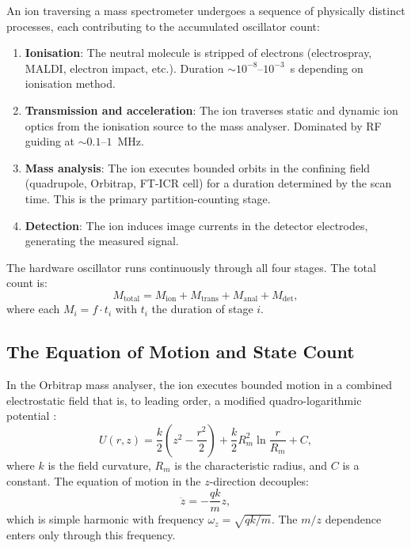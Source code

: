 \documentclass[twocolumn,10pt]{article}
\begin{document}
An ion traversing a mass spectrometer undergoes a sequence of physically distinct processes, each contributing to the accumulated oscillator count:

\begin{enumerate}
    \item \textbf{Ionisation}: The neutral molecule is stripped of electrons (electrospray, MALDI, electron impact, etc.). Duration $\sim 10^{-8}$--$10^{-3}$~s depending on ionisation method.

    \item \textbf{Transmission and acceleration}: The ion traverses static and dynamic ion optics from the ionisation source to the mass analyser. Dominated by RF guiding at $\sim 0.1$--$1$~MHz.

    \item \textbf{Mass analysis}: The ion executes bounded orbits in the confining field (quadrupole, Orbitrap, FT-ICR cell) for a duration determined by the scan time. This is the primary partition-counting stage.

    \item \textbf{Detection}: The ion induces image currents in the detector electrodes, generating the measured signal.
\end{enumerate}

The hardware oscillator runs continuously through all four stages. The total count is:
\begin{equation}
    M_{\mathrm{total}} = M_{\mathrm{ion}} + M_{\mathrm{trans}} + M_{\mathrm{anal}} + M_{\mathrm{det}},
\end{equation}
where each $M_i = f \cdot t_i$ with $t_i$ the duration of stage $i$.

\subsection{The Equation of Motion and State Count}

In the Orbitrap mass analyser, the ion executes bounded motion in a combined electrostatic field that is, to leading order, a modified quadro-logarithmic potential \citep{makarov2000}:
\begin{equation}
    U(r, z) = \frac{k}{2}\left(z^2 - \frac{r^2}{2}\right) + \frac{k}{2}R_m^2 \ln\frac{r}{R_m} + C,
\end{equation}
where $k$ is the field curvature, $R_m$ is the characteristic radius, and $C$ is a constant. The equation of motion in the $z$-direction decouples:
\begin{equation}
    \ddot{z} = -\frac{qk}{m}z,
\end{equation}
which is simple harmonic with frequency $\omega_z = \sqrt{qk/m}$. The $m/z$ dependence enters only through this frequency.
\end{document}
